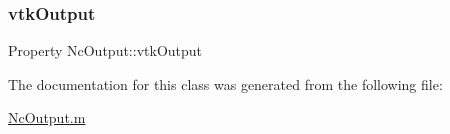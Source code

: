 \mbox{\label{class_nc_output_a2e13af34857240d97757f70a45f8d901}} 
\subsubsection{\texorpdfstring{vtk\+Output}{vtkOutput}}
{\footnotesize\ttfamily Property Nc\+Output\+::vtk\+Output\hspace{0.3cm}{\ttfamily [protected]}}



The documentation for this class was generated from the following file\+:\begin{DoxyCompactItemize}
\item 
\hyperlink{_nc_output_8m}{Nc\+Output.\+m}\end{DoxyCompactItemize}
